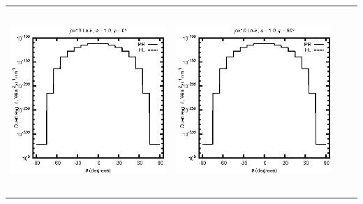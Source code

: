 \begin{tabular}{c c c c}
\includegraphics[height=7cm]{../eps/jok10_Ld_ir_fwd.eps} &
\includegraphics[height=7cm]{../eps/jok10_Ld_ir_cross.eps} \\
\end{tabular}

\pagebreak


